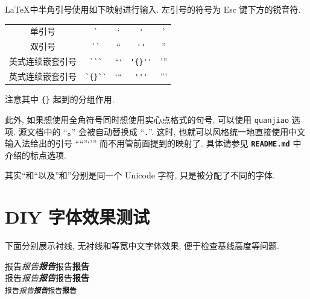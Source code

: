 \documentclass[font=fandol]{mpltx}
\newcommand{\note}[1]{{\color{gray}#1}}
\newcommand*\code[1]{\texttt{#1}}
\newcommand*\file[1]{\textbf{\texttt{#1}}}
\begin{document}
\LaTeX 中半角引号使用如下映射进行输入.
左引号的符号为 \textsf{Esc} 键下方的锐音符.
\begin{center}
	\begin{tabular}{c@{\quad}c@{\ $\rightarrow$\ }c@{\quad}c@{\ $\rightarrow$\ }c}
		单引号           & \verb|`|     & `     & \verb|'|     & '     \\
		双引号           & \verb|``|    & ``    & \verb|''|    & ''    \\
		美式连续嵌套引号 & \verb|```|   & ```   & \verb|'{}''| & '{}'' \\
		英式连续嵌套引号 & \verb|`{}``| & `{}`` & \verb|'''|   & '''   \\
	\end{tabular}
\end{center}
注意其中 \code{\{\}} 起到的分组作用.

此外, 如果想使用全角符号同时想使用实心点格式的句号, 可以使用 \code{quanjiao} 选项.
源文档中的 ``。'' 会被自动替换成 ``．''.
这时, 也就可以风格统一地直接使用中文输入法给出的引号 ``“”‘’'' 而不用管前面提到的映射了.
具体请参见 \file{README.md} 中介绍的标点选项.

\note{其实“和``以及”和''分别是同一个 Unicode 字符, 只是被分配了不同的字体.}

\section{DIY 字体效果测试}

\newcommand{\testword}{报告}
\newcommand{\andbold}{\testword{}\textbf{\testword{}}}
\newcommand{\testline}{\testword{}\emph{\andbold{}}\andbold{}}

下面分别展示衬线, 无衬线和等宽中文字体效果, 便于检查基线高度等问题.
\begin{center}
	\textrm{\testline}\\
	\textsf{\testline}\\
	\texttt{\testline}
\end{center}
\end{document}
